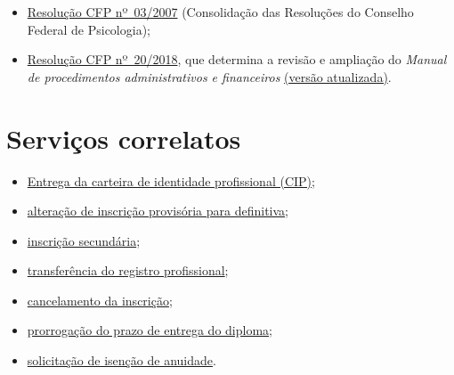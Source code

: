 \begin{itemize}
\item	\href{https://atosoficiais.com.br/cfp/resolucao-administrativa-financeira-n-3-2007-institui-a-consolidacao-das-resolucoes-do-conselho-federal-de-psicologia}{Resolução CFP nº~03/2007} (Consolidação das Resoluções do Conselho Federal de Psicologia);
\item	\href{https://transparencia.cfp.org.br/wp-content/uploads/sites/7/2020/05/Manual-de-Procedimentos-Administrativos-e-Financeiro-CFP-RES-20.2018.pdf}{\href{https://atosoficiais.com.br/cfp/resolucao-administrativa-financeira-n-20-2018-altera-o-manual-de-procedimentos-administrativo-e-financeiro-do-sistema-conselhos-de-psicologia-anexo-da-resolucao-cfp-n-202018-a-resolucao-cfp-n-03-2007-a-resolucao-cfp-n-16-2019-e-da-outras-providencias}{Resolução CFP nº~20/2018}}, que determina a revisão e ampliação do \emph{Manual de procedimentos administrativos e financeiros} \href{https://transparencia.cfp.org.br/wp-content/uploads/sites/7/2020/05/Manual-de-Procedimentos-Administrativos-e-Financeiro-CFP-RES-20.2018.pdf}{(versão atualizada)}.
\end{itemize}

\section{Serviços correlatos}

\begin{itemize}
\item	\hyperref[chap:pf-cip]{Entrega da carteira de identidade profissional (CIP)};
\item	\hyperref[chap:pf-inscricao_definitiva]{alteração de inscrição provisória para definitiva};
\item	\hyperref[chap:pf-secundaria]{inscrição secundária};
\item	\hyperref[chap:pf-transferencia]{transferência do registro profissional};
\item	\hyperref[chap:pf-cancelamento]{cancelamento da inscrição};
\item	\hyperref[chap:pf-prorroga_diploma]{prorrogação do prazo de entrega do diploma};
\item	\hyperref[chap:pf-isencao]{solicitação de isenção de anuidade}.
\end{itemize}

\sumario

